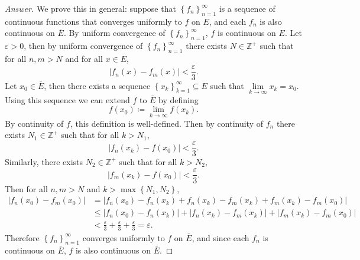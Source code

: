 \documentclass[12pt]{article}
\newcommand{\z}{\mathbb{Z}}
\newcommand\paren[1]{\left( #1 \right)}
\newcommand\setb[1]{\left \{ #1 \right \}}
\newcommand{\abs}[1]{\left | #1 \right |}
\newcommand{\eps}{\varepsilon}
\theoremstyle{definition}
\begin{document}
\begin{proof}[Answer]
    We prove this in general: suppose that $\setb{ f_n }_{n=1}^{\infty}$ is a sequence of continuous functions that converges uniformly to $f$ on $E$, and each $f_n$ is also continuous on $\overline{E}$. By uniform convergence of $\setb{ f_n }_{n=1}^{\infty}$, $f$ is continuous on $E$. 
    Let $\eps > 0$, then by uniform convergence of $\setb{ f_n }_{n=1}^{\infty}$ there exists $N \in \z^+$ such that for all $n , m > N$ and for all $x \in E$,
    \[
        \abs{ f_n(x) - f_m(x) } < \frac{\eps}{3}.
    \]
    Let $x_0 \in \overline{E}$, then there exists a sequence $\setb{ x_k }_{k=1}^{\infty} \subseteq E$ such that $\lim\limits_{k \to \infty} x_k = x_0$. Using this sequence we can extend $f$ to $\overline{E}$ by defining
    \[
        f \paren{ x_0 } \coloneqq \lim\limits_{k \to \infty} f \paren{ x_k }.
    \]
    By continuity of $f$, this definition is well-defined. Then by continuity of $f_n$ there exists $N_1 \in \z^+$ such that for all $k > N_1$,
    \[
        \abs{ f_n \paren{ x_k } - f \paren{ x_0 } } < \frac{\eps}{3}.
    \]
    Similarly, there exists $N_2 \in \z^+$ such that for all $k > N_2$, 
    \[
        \abs{ f_m \paren{ x_k } - f \paren{ x_0 } } < \frac{\eps}{3}.
    \]
    Then for all $n , m > N$ and $k > \max \setb{ N_1 , N_2 }$,
    \begin{align*}
        \abs{ f_n \paren{ x_0 } - f_m \paren{ x_0 } } & = \abs{ f_n \paren{ x_0 } - f_n \paren{ x_k } + f_n \paren{ x_k } - f_m \paren{ x_k } + f_m \paren{ x_k } - f_m \paren{ x_0 } } \\
        & \leq \abs{ f_n \paren{ x_0 } - f_n \paren{ x_k } } + \abs{ f_n \paren{ x_k } - f_m \paren{ x_k } } + \abs{ f_m \paren{ x_k } - f_m \paren{ x_0 } } \\
        & < \frac{\eps}{3} + \frac{\eps}{3} + \frac{\eps}{3} = \eps.
    \end{align*}
    Therefore $\setb{ f_n }_{n=1}^{\infty}$ converges uniformly to $f$ on $\overline{E}$, and since each $f_n$ is continuous on $\overline{E}$, $f$ is also continuous on $\overline{E}$.
\end{proof}
\end{document}
